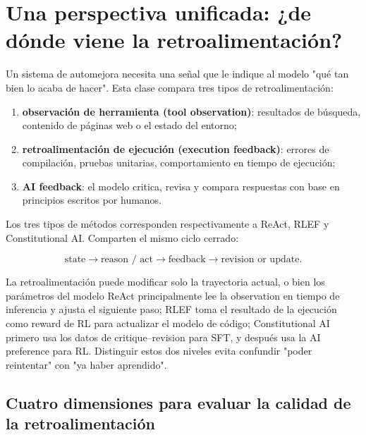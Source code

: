 \section{Una perspectiva unificada: ¿de dónde viene la retroalimentación?}

Un sistema de automejora necesita una señal que le indique al modelo "qué tan bien lo acaba de hacer". Esta clase compara tres tipos de retroalimentación:

\begin{enumerate}
    \item \textbf{observación de herramienta (tool observation)}: resultados de búsqueda, contenido de páginas web o el estado del entorno;
    \item \textbf{retroalimentación de ejecución (execution feedback)}: errores de compilación, pruebas unitarias, comportamiento en tiempo de ejecución;
    \item \textbf{AI feedback}: el modelo critica, revisa y compara respuestas con base en principios escritos por humanos.
\end{enumerate}


Los tres tipos de métodos corresponden respectivamente a ReAct, RLEF y Constitutional AI. Comparten el mismo ciclo cerrado:

$$
\text{state}\rightarrow\text{reason / act}\rightarrow\text{feedback}
\rightarrow\text{revision or update}.
$$

\begin{importantbox}{La retroalimentación puede modificar solo la trayectoria actual, o bien los parámetros del modelo}
ReAct principalmente lee la observation en tiempo de inferencia y ajusta el siguiente paso; RLEF toma el resultado de la ejecución como reward de RL para actualizar el modelo de código; Constitutional AI primero usa los datos de critique--revision para SFT, y después usa la AI preference para RL. Distinguir estos dos niveles evita confundir "poder reintentar" con "ya haber aprendido".
\end{importantbox}

\subsection{Cuatro dimensiones para evaluar la calidad de la retroalimentación}

